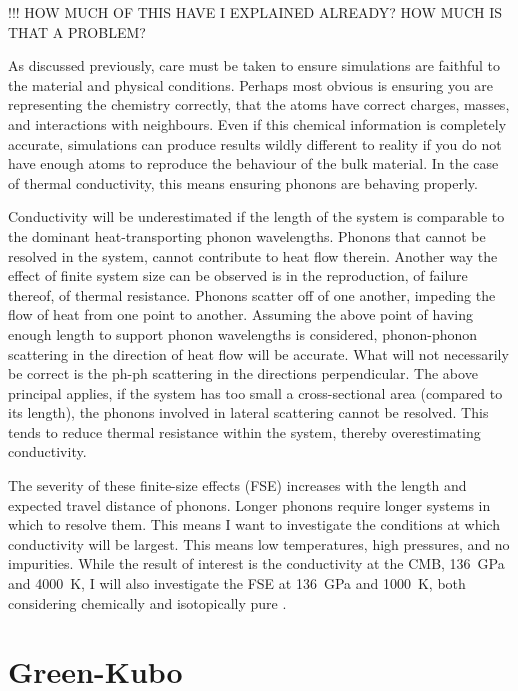 !!! HOW MUCH OF THIS HAVE I EXPLAINED ALREADY? HOW MUCH IS THAT A PROBLEM?

As discussed previously, care must be taken to ensure simulations are faithful to the material and physical conditions. Perhaps most obvious is ensuring you are representing the chemistry correctly, that the atoms have correct charges, masses, and interactions with neighbours. Even if this chemical information is completely accurate, simulations can produce results wildly different to reality if you do not have enough atoms to reproduce the behaviour of the bulk material. In the case of thermal conductivity, this means ensuring phonons are behaving properly.

Conductivity will be underestimated if the length of the system is comparable to the dominant heat-transporting phonon wavelengths. Phonons that cannot be resolved in the system, cannot contribute to heat flow therein. Another way the effect of finite system size can be observed is in the reproduction, of failure thereof, of thermal resistance. Phonons scatter off of one another, impeding the flow of heat from one point to another. Assuming the above point of having enough length to support phonon wavelengths is considered, phonon-phonon scattering in the direction of heat flow will be accurate. What will not necessarily be correct is the ph-ph scattering in the directions perpendicular. The above principal applies, if the system has too small a cross-sectional area (compared to its length), the phonons involved in lateral scattering cannot be resolved. This tends to reduce thermal resistance within the system, thereby overestimating conductivity.

The severity of these finite-size effects (FSE) increases with the length and expected travel distance of phonons. Longer phonons require longer systems in which to resolve them. This means I want to investigate the conditions at which conductivity will be largest. This means low temperatures, high pressures, and no impurities. While the result of interest is the conductivity at the CMB, 136~GPa and 4000~K, I will also investigate the FSE at 136~GPa  and 1000~K, both considering chemically and isotopically pure \mgsios \bdg.





\section{\label{sec:3.GK}Green-Kubo}


